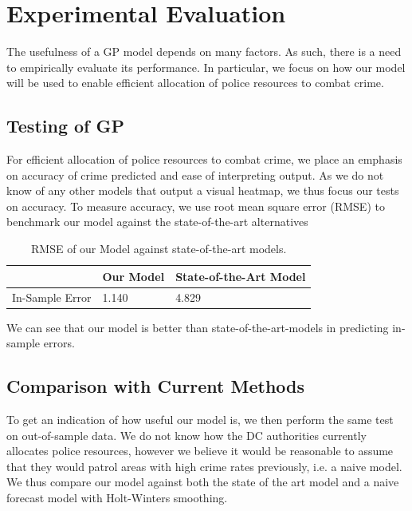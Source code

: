 \documentclass[a4paper, 10pt, conference]{ieeeconf}
\begin{document}
	\section{Experimental Evaluation}
	The usefulness of a GP model depends on many factors. As such, there is a need to empirically evaluate its performance.
	In particular, we focus on how our model will be used to enable efficient allocation of police resources to combat crime.

	\subsection{Testing of GP}
	For efficient allocation of police resources to combat crime, we place an emphasis on accuracy of crime predicted and ease of interpreting output.
	As we do not know of any other models that output a visual heatmap, we thus focus our tests on accuracy.
	To measure accuracy, we use root mean square error (RMSE) to benchmark our model against the state-of-the-art alternatives \cite{c06}
	

	\begin{table}[!ht]
		\resizebox{\linewidth}{!} {
		\begin{tabular}{| l | l | l | }
		\hline
		& Our Model & State-of-the-Art Model \\ \hline
		In-Sample Error & 1.140 & 4.829\\
		\hline
		\end{tabular}
		}
		\caption{RMSE of our Model against state-of-the-art models.}
		\label{t1}
	\end{table}
	
	We can see that our model is better than state-of-the-art-models in predicting in-sample errors.

	\subsection{Comparison with Current Methods}
	
	To get an indication of how useful our model is, we then perform the same test on out-of-sample data.
	We do not know how the DC authorities currently allocates police resources, however we believe it would be reasonable to assume that they would patrol areas with high crime rates previously, i.e. a naive model.
	We thus compare our model against both the state of the art model and a naive forecast model with Holt-Winters smoothing.
	
\end{document}
